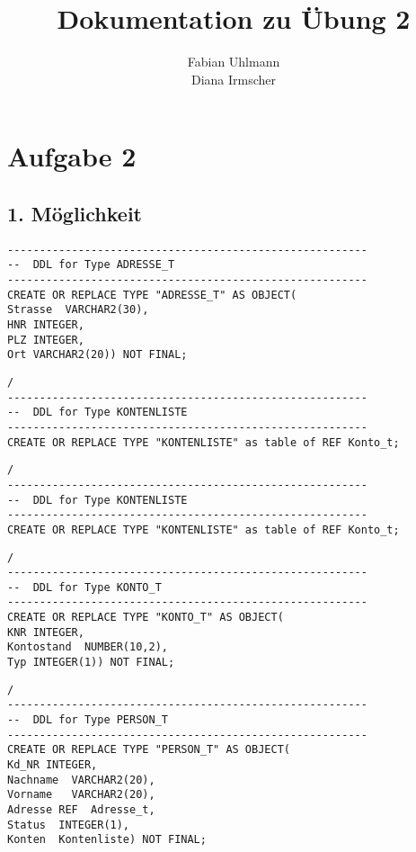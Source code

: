 \documentclass{scrartcl}
\begin{document}
\lstset{language=SQL} 
\begin{titlepage}
\titlehead{Hochschule München, Fakultät 07, SoSe 2016}
\subject{Datenbanken 2}
\title{Dokumentation zu Übung 2}
\subtitle{}
\author{Fabian Uhlmann \\Diana Irmscher}
\end{titlepage}

\maketitle

\section*{Aufgabe 2}
\subsection*{1. Möglichkeit}
\begin{lstlisting}
--------------------------------------------------------
--  DDL for Type ADRESSE_T
--------------------------------------------------------
CREATE OR REPLACE TYPE "ADRESSE_T" AS OBJECT(
Strasse  VARCHAR2(30),
HNR INTEGER,
PLZ INTEGER,
Ort VARCHAR2(20)) NOT FINAL;
\end{lstlisting}
\begin{lstlisting}
/
--------------------------------------------------------
--  DDL for Type KONTENLISTE
--------------------------------------------------------
CREATE OR REPLACE TYPE "KONTENLISTE" as table of REF Konto_t;
\end{lstlisting}
\begin{lstlisting}
/
--------------------------------------------------------
--  DDL for Type KONTENLISTE
--------------------------------------------------------
CREATE OR REPLACE TYPE "KONTENLISTE" as table of REF Konto_t;
\end{lstlisting}
\begin{lstlisting}
/
--------------------------------------------------------
--  DDL for Type KONTO_T
--------------------------------------------------------
CREATE OR REPLACE TYPE "KONTO_T" AS OBJECT(
KNR INTEGER,
Kontostand  NUMBER(10,2),
Typ INTEGER(1)) NOT FINAL;
\end{lstlisting}
\begin{lstlisting}
/
--------------------------------------------------------
--  DDL for Type PERSON_T
--------------------------------------------------------
CREATE OR REPLACE TYPE "PERSON_T" AS OBJECT(
Kd_NR INTEGER,
Nachname  VARCHAR2(20),
Vorname   VARCHAR2(20),
Adresse REF  Adresse_t,
Status  INTEGER(1),
Konten  Kontenliste) NOT FINAL;
\end{lstlisting}
\end{document}
